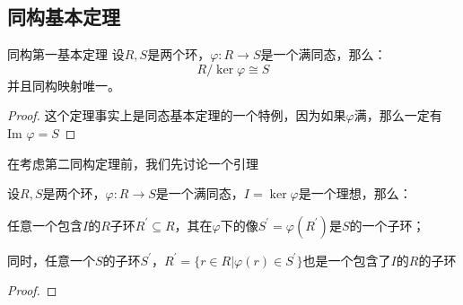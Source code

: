\documentclass[12pt, a4paper, oneside, UTF8]{ctexbook}
\begin{document}
		\subsection{同构基本定理}
			\begin{them}{同构第一基本定理}{}
				设$R,S$是两个环，$\varphi : R \rightarrow S$是一个满同态，那么：
				\begin{equation}
					R / \ker \varphi \cong S
				\end{equation}
				并且同构映射唯一。
			\end{them}
			\begin{proof}
				这个定理事实上是同态基本定理的一个特例，因为如果$\varphi $满，那么一定有$\text{Im }\varphi = S$
			\end{proof}
			在考虑第二同构定理前，我们先讨论一个引理
			\begin{lemma}{}{}
				设$R,S$是两个环，$\varphi : R \rightarrow S$是一个满同态，$I=\ker \varphi$是一个理想，那么：

				任意一个包含$I$的$R$子环$R^{\prime} \subseteq R$，其在$\varphi $下的像$S^{\prime}=\varphi (R^{\prime})$是$S$的一个子环；

				同时，任意一个$S$的子环$S^{\prime}$，$R^{\prime}=\{r \in R| \varphi (r) \in S^{\prime}\}$也是一个包含了$I$的$R$的子环
			\end{lemma}
			\begin{proof}
				
			\end{proof}

\end{document}
